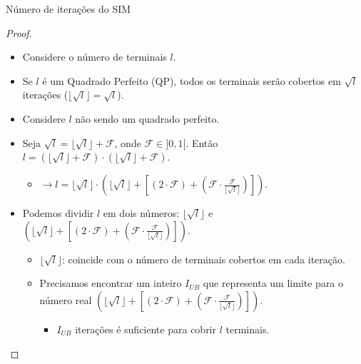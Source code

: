 \documentclass[10pt]{beamer}
\begin{document}
\begin{frame}{Número de iterações do SIM}
  \begin{proof}%
    \begin{itemize}
      \item <1-> Considere o número de terminais $l$.
      \item <2-> Se $l$ é um Quadrado Perfeito (QP), todos os terminais serão cobertos em $\sqrt{l}$ iterações ($\lfloor\sqrt{l}\rfloor = \sqrt{l}$).
      \item <3-> Considere $l$ não sendo um quadrado perfeito.
      \item <4-> Seja $\sqrt{l} = \lfloor\sqrt{l}\rfloor + \mathcal{F}$, onde $\mathcal{F} \in ]0,1[$. Então $l = (\lfloor\sqrt{l}\rfloor + \mathcal{F}) \cdot (\lfloor\sqrt{l}\rfloor + \mathcal{F})$.
      \begin{itemize}
	\item <5-> $\rightarrow l = \lfloor\sqrt{l}\rfloor \cdot \left(\lfloor\sqrt{l}\rfloor + \left[(2 \cdot \mathcal{F}) + \left(\mathcal{F} \cdot \frac{\mathcal{F}}{\lfloor\sqrt{l}\rfloor}\right)\right]\right)$.
      \end{itemize}
      \item <6-> Podemos dividir $l$ em dois números: $\lfloor\sqrt{l}\rfloor$ e $(\lfloor\sqrt{l}\rfloor + [(2 \cdot \mathcal{F}) + (\mathcal{F} \cdot \frac{\mathcal{F}}{\lfloor\sqrt{l}\rfloor})])$.
      \begin{itemize}
	\item <7-> $\lfloor\sqrt{l}\rfloor$: coincide com o número de terminais cobertos em cada iteração.
	\item <8-> Precisamos encontrar um inteiro $I_{UB}$ que representa um limite para o número real $(\lfloor\sqrt{l}\rfloor + [(2 \cdot \mathcal{F}) + (\mathcal{F} \cdot \frac{\mathcal{F}}{\lfloor\sqrt{l}\rfloor})])$.
	\begin{itemize}
	  \item <9-> $I_{UB}$ iterações é suficiente para cobrir $l$ terminais.
	\end{itemize}
      \end{itemize}
    \end{itemize}
  \end{proof}
\end{frame}
\end{document}
